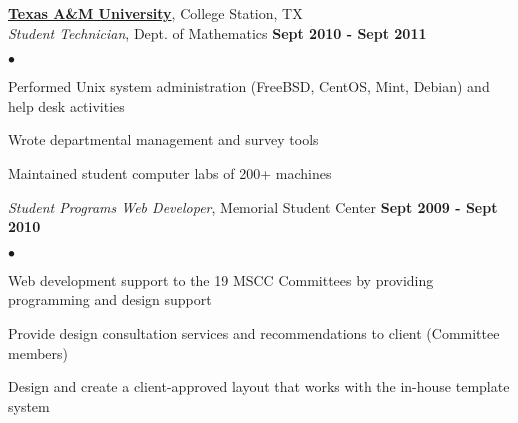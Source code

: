 \documentclass[margin,line]{res}
\newenvironment{list2}
  {\vspace{-4mm}
   \begin{list}{$\bullet$}{
     \setlength{\itemsep}{0in}
     \setlength{\parsep}{0in} \setlength{\parskip}{0in}
     \setlength{\topsep}{0in} \setlength{\partopsep}{0in}
     \setlength{\leftmargin}{0.18in}}}
  {\end{list}}
\begin{document}
\begin{resume}
{\bf \href{http://tamu.edu}{Texas A\&M University}}, College Station, TX \\
{\em Student Technician}, Dept. of Mathematics                    \hfill {\bf Sept 2010 - Sept 2011} \\
\begin{list2}
\item Performed Unix system administration (FreeBSD, CentOS, Mint, Debian) and help desk activities
\item Wrote departmental management and survey tools
\item Maintained student computer labs of 200+ machines
\end{list2}

{\em Student Programs Web Developer}, Memorial Student Center     \hfill {\bf Sept 2009 - Sept 2010} \\
\begin{list2}
\item Web development support to the 19 MSCC Committees by providing programming and design support
\item Provide design consultation services and recommendations to client (Committee members)
\item Design and create a client-approved layout that works with the in-house template system
\end{list2}


%
%

\end{resume}
\end{document}
